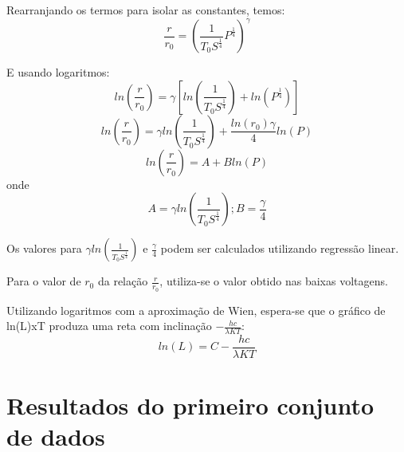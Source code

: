 \documentclass[brazilian,12pt,a4paper,final]{article}
\begin{document}
Rearranjando os termos para isolar as constantes, temos:
$$\frac{r}{r_0}=(\frac{1}{T_0S^\frac{1}{4}}P^\frac{1}{4})^\gamma$$

E usando logaritmos:
$$ln(\frac{r}{r_0})=\gamma[ln(\frac{1}{T_0S^\frac{1}{4}})+ln(P^\frac{1}{4})]$$
$$ln(\frac{r}{r_0})=\gamma ln(\frac{1}{T_0S^\frac{1}{4}})+\frac{ln(r_0)\gamma}{4}ln(P)$$
$$ln(\frac{r}{r_0})=A+Bln(P)$$
onde
$$A=\gamma ln(\frac{1}{T_0S^\frac{1}{4}}); B=\frac{\gamma}{4}$$


Os valores para $\gamma ln(\frac{1}{T_0S^\frac{1}{4}})$
e $\frac{\gamma}{4}$ podem ser calculados utilizando regressão linear.

Para o valor de $r_0$ da relação $\frac{r}{r_0}$, utiliza-se o valor obtido 
nas baixas voltagens.

Utilizando logaritmos com a aproximação de Wien, espera-se que 
o gráfico de ln(L)xT produza uma reta com inclinação 
$-\frac{hc}{\lambda KT}$:
\[
ln(L) =C-\frac{hc}{\lambda KT}
\]

\section{Resultados do primeiro conjunto de dados}
\end{document}
